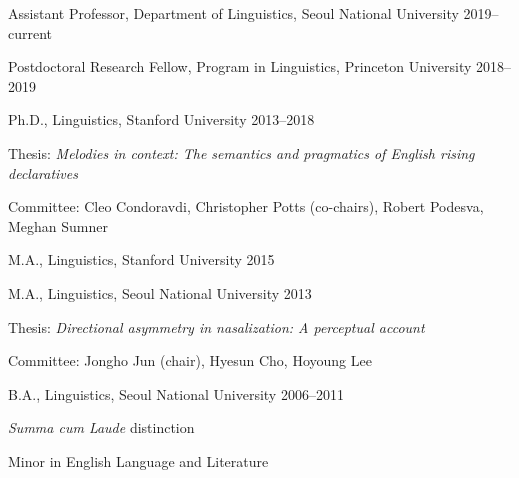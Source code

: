 \documentclass[letterpaper]{article}
\renewenvironment{itemize}{
  \begin{list}{}{
    \setlength{\leftmargin}{1.5em}
  }
}{
  \end{list}
}
\begin{document}
\begin{itemize}\itemsep -1pt
  \item Assistant Professor, Department of Linguistics, Seoul National University \hfill 2019--current

  \vspace{0.08in}

  \item Postdoctoral Research Fellow, Program in Linguistics, Princeton University \hfill 2018--2019

  \vspace{0.08in}

  \item Ph.D., Linguistics, Stanford University \hfill 2013--2018
  
  \vspace{-0.08in}
    
  \begin{itemize}\setlength{\itemsep}{0pt}
  \item Thesis: \emph{Melodies in context: The semantics and pragmatics of English rising declaratives}
  \item Committee: Cleo Condoravdi, Christopher Potts (co-chairs), Robert Podesva, Meghan Sumner
  \end{itemize}

  \item M.A., Linguistics, Stanford University \hfill 2015
  
  \item M.A., Linguistics, Seoul National University \hfill 2013
  
  \vspace{-0.08in}
    
    \begin{itemize}\setlength{\itemsep}{0pt}
    \item Thesis: \emph{Directional asymmetry in nasalization: A perceptual account}
    \item Committee: Jongho Jun (chair), Hyesun Cho, Hoyoung Lee
    \end{itemize}
 
  \item B.A., Linguistics, Seoul National University \hfill 2006--2011
  
  \vspace{-0.08in}
  
    \begin{itemize}\setlength{\itemsep}{0pt}
    \item {\it Summa cum Laude} distinction
    \item Minor in English Language and Literature
    \end{itemize}
  
\end{itemize}
\end{document}
